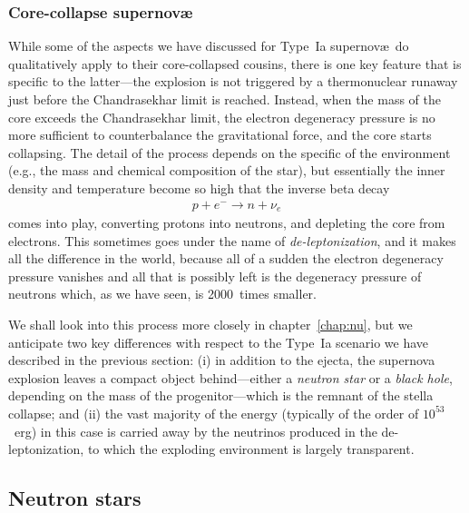\subsubsection{Core-collapse supernov\ae}

While some of the aspects we have discussed for Type~Ia supernov\ae\ do qualitatively
apply to their core-collapsed cousins, there is one key feature that is specific
to the latter---the explosion is not triggered by a thermonuclear runaway just
before the Chandrasekhar limit is reached. Instead, when the mass of the core
exceeds the Chandrasekhar limit, the electron degeneracy pressure is no more sufficient
to counterbalance the gravitational force, and the core starts collapsing. The detail
of the process depends on the specific of the environment (e.g., the mass and
chemical composition of the star), but essentially the inner density and temperature
become so high that the inverse beta decay
\begin{align}
  p + e^- \rightarrow n + \nu_e
\end{align}
comes into play, converting protons into neutrons, and depleting the core from
electrons. This sometimes goes under the name of \emph{de-leptonization}, and it makes
all the difference in the world, because all of a sudden the electron degeneracy
pressure vanishes and all that is possibly left is the degeneracy pressure of neutrons
which, as we have seen, is 2000~times smaller.

We shall look into this process more closely in chapter~\ref{chap:nu}, but we anticipate
two key differences with respect to the Type~Ia scenario we have described in the
previous section: (i) in addition to the ejecta, the supernova explosion leaves a
compact object behind---either a \emph{neutron star} or a \emph{black hole}, depending
on the mass of the progenitor---which is the remnant of the stella collapse; and (ii)
the vast majority of the energy (typically of the order of $10^{53}$~erg) in this case is
carried away by the neutrinos produced in the de-leptonization, to which the exploding
environment is largely transparent.






\subsection{Neutron stars}
\label{sec:neutron_stars}

